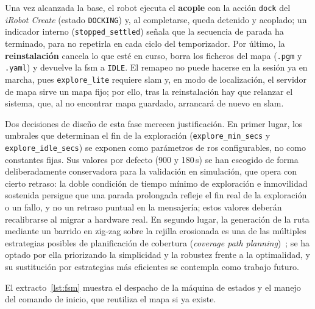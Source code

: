 Una vez alcanzada la base, el robot ejecuta el
\textbf{acople} con la acción \texttt{dock} del \textit{iRobot Create} (estado
\texttt{DOCKING}) y, al completarse, queda detenido y acoplado; un indicador interno
(\texttt{stopped\_settled}) señala que la secuencia de parada ha terminado, para no
repetirla en cada ciclo del temporizador. Por último, la
\textbf{reinstalación} cancela lo que esté en curso, borra los ficheros del mapa
(\texttt{.pgm} y \texttt{.yaml}) y devuelve la \gls{fsm} a \texttt{IDLE}. El remapeo no
puede hacerse en la sesión ya en marcha, pues \texttt{explore\_lite} requiere \gls{slam}
y, en modo de localización, el servidor de mapa sirve un mapa fijo; por ello, tras la
reinstalación hay que relanzar el sistema, que, al no encontrar mapa guardado, arrancará
de nuevo en \gls{slam}.

Dos decisiones de diseño de esta fase merecen justificación. En primer lugar, los
umbrales que determinan el fin de la exploración (\texttt{explore\_min\_secs} y
\texttt{explore\_idle\_secs}) se exponen como parámetros de \gls{ros} configurables,
no como constantes fijas. Sus valores por defecto (900 y 180\,s) se han escogido de
forma deliberadamente conservadora para la validación en simulación, que opera con
cierto retraso: la doble condición de tiempo mínimo de exploración e inmovilidad
sostenida persigue que una parada prolongada refleje el fin real de la exploración o
un fallo, y no un retraso puntual en la mensajería; estos valores deberán
recalibrarse al migrar a hardware real. En segundo lugar, la generación de la ruta
mediante un barrido en zig-zag sobre la rejilla erosionada es una de las múltiples
estrategias posibles de planificación de cobertura (\textit{coverage path
planning})~\parencite{galceran2013coverage}; se ha optado por ella priorizando la
simplicidad y la robustez frente a la optimalidad, y su sustitución por estrategias
más eficientes se contempla como trabajo futuro.

El extracto~\ref{lst:fsm} muestra el despacho de la máquina de estados y el manejo
del comando de inicio, que reutiliza el mapa si ya existe.

